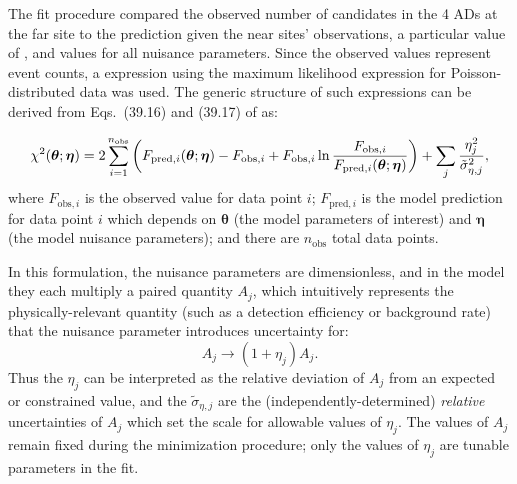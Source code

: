 The fit procedure compared the observed number of \nuebar{} candidates
in the 4 ADs at the far site to the prediction
given the near sites' observations, a particular value of \thetaot{},
and values for all nuisance parameters.
Since the observed values represent event counts,
a \chisquare{} expression using the maximum likelihood expression
for Poisson-distributed data was used.
The generic structure of such \chisquare{} expressions
can be derived from Eqs.~(39.16) and (39.17) of \cite{pdg} as:

\begin{equation}
    \label{eq:chisquare_generic}
    \chi^2(\boldsymbol{\theta};\boldsymbol{\eta}) = 2\sum_{i=1}^{n_\text{obs}} \left(
        F_{\text{pred},i}(\boldsymbol{\theta};\boldsymbol{\eta}) - F_{\text{obs},i}
        + F_{\text{obs},i}\ln
        \frac{F_{\text{obs},i}}{F_{\text{pred},i}(\boldsymbol{\theta};\boldsymbol{\eta})}
        \right)
        +
        \sum_j \frac{\eta_j^2}{\tilde{\sigma}_{\eta,j}^2},
\end{equation}
where $F_{\text{obs},i}$ is the observed value for data point $i$;
$F_{\text{pred},i}$
is the model prediction for data point $i$
which depends on $\boldsymbol{\theta}$ (the model parameters of interest)
and $\boldsymbol{\eta}$
(the model nuisance parameters);
and there are $n_\text{obs}$ total data points.

In this formulation, the nuisance parameters are dimensionless,
and in the model they each multiply a paired quantity $A_j$,
which intuitively represents the physically-relevant quantity
(such as a detection efficiency or background rate)
that the nuisance parameter introduces uncertainty for:
\begin{equation}
    A_j \to (1+\eta_j)A_j.
\end{equation}
Thus the $\eta_j$ can be interpreted as the relative deviation of $A_j$
from an expected or constrained value,
and the $\tilde{\sigma}_{\eta,j}$ are the (independently-determined)
\emph{relative} uncertainties of $A_j$
which set the scale for allowable values of $\eta_j$.
The values of $A_j$ remain fixed during the minimization procedure;
only the values of $\eta_j$ are tunable parameters in the fit.

